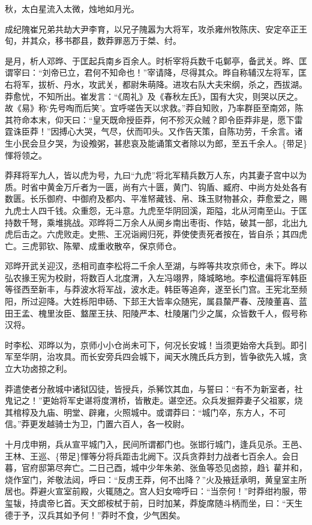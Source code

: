 \documentclass[]{article}
\begin{document}
秋，太白星流入太微，烛地如月光。

成纪隗崔兄弟共劫大尹李育，以兄子隗嚣为大将军，攻杀雍州牧陈庆、安定卒正王旬，并其众，移书郡县，数莽罪恶万于桀、纣。

是月，析人邓晔、于匡起兵南乡百余人。时析宰将兵数千屯鄡亭，备武关。晔、匡谓宰曰：``刘帝已立，君何不知命也！''宰请降，尽得其众。晔自称辅汉左将军，匡右将军，拔析、丹水，攻武关，都尉朱萌降。进攻右队大夫宋纲，杀之，西拔湖。莽愈忧，不知所出。崔发言：``《周礼》及《春秋左氏》，国有大灾，则哭以厌之。故《易》称`先号啕而后笑'。宜呼嗟告天以求救。''莽自知败，乃率群臣至南郊，陈其符命本末，仰天曰：``皇天既命授臣莽，何不殄灭众贼？即令臣莽非是，愿下雷霆诛臣莽！''因搏心大哭，气尽，伏而叩头。又作告天策，自陈功劳，千余言。诸生小民会旦夕哭，为设飧粥，甚悲哀及能诵策文者除以为郎，至五千余人。\{带足\}惲将领之。

莽拜将军九人，皆以虎为号，九曰``九虎''将北军精兵数万人东，内其妻子宫中以为质。时省中黄金万斤者为一匮，尚有六十匮，黄门、钩盾、臧府、中尚方处处各有数匮。长乐御府、中御府及都内、平准帑藏钱、帛、珠玉财物甚众，莽愈爱之，赐九虎士人四千钱。众重怨，无斗意。九虎至华阴回溪，距隘，北从河南至山。于匡持数千弩，乘堆挑战。邓晔将二万余人从阌乡南出枣街、作姑，破其一部，北出九虎后击之。六虎败走。史熊、王况诣阙归死，莽使使责死者按在，皆自杀；其四虎亡。三虎郭钦、陈翚、成重收散卒，保京师仓。

邓晔开武关迎汉，丞相司直李松将二千余人至湖，与晔等共攻京师仓，未下。晔以弘农掾王宪为校尉，将数百人北度渭，入左冯翊界，降城略地。李松遣偏将军韩臣等径西至新丰，与莽波水将军战，波水走。韩臣等追奔，遂至长门宫。王宪北至频阳，所过迎降。大姓栎阳申砀、下邽王大皆率众随宪，属县斄严春、茂陵董喜、蓝田王孟、槐里汝臣、盩厔王扶、阳陵严本、杜陵屠门少之属，众皆数千人，假号称汉将。

时李松、邓晔以为，京师小小仓尚未可下，何况长安城！当须更始帝大兵到。即引军至华阴，治攻具。而长安旁兵四会城下，闻天水隗氏兵方到，皆争欲先入城，贪立大功卤掠之利。

莽遣使者分赦城中诸狱囚徒，皆授兵，杀豨饮其血，与誓曰：``有不为新室者，社鬼记之！''更始将军史谌将度渭桥，皆散走。谌空还。众兵发掘莽妻子父祖冢，烧其棺椁及九庙、明堂、辟雍，火照城中。或谓莽曰：``城门卒，东方人，不可信。''莽更发越骑士为卫，门置六百人，各一校尉。

十月戊申朔，兵从宣平城门入，民间所谓都门也。张邯行城门，逢兵见杀。王邑、王林、王巡、\{带足\}惲等分将兵距击北阙下。汉兵贪莽封力战者七百余人。会日暮，官府邸第尽奔亡。二日己酉，城中少年朱弟、张鱼等恐见卤掠，趋讠雚并和，烧作室门，斧敬法闼，呼曰：``反虏王莽，何不出降？''火及掖廷承明，黄皇室主所居也。莽避火宣室前殿，火辄随之。宫人妇女啼呼曰：``当奈何！''时莽绀袀服，带玺韨，持虞帝匕首。天文郎桉栻于前，日时加某，莽旋席随斗柄而坐，曰：``天生德于予，汉兵其如予何！''莽时不食，少气困矣。
\end{document}
